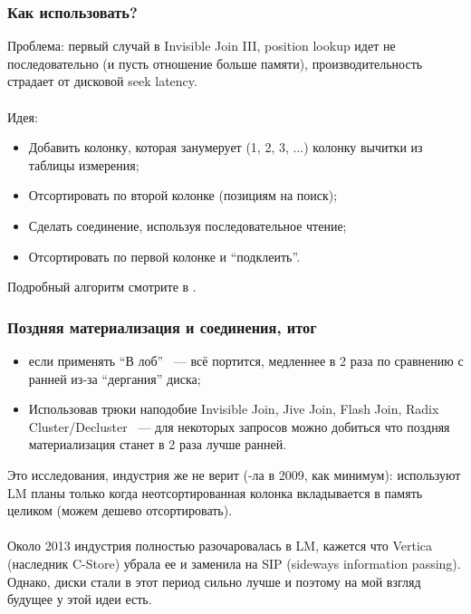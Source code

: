 \documentclass{beamer}
\begin{document}
\begin{frame}
\frametitle{Как использовать?}

Проблема: первый случай в Invisible Join III, position lookup идет не последовательно (и пусть отношение больше памяти), производительность страдает от дисковой seek latency.\\~\\

Идея:
\begin{itemize}
  \item Добавить колонку, которая занумерует (1, 2, 3, ...) колонку вычитки из таблицы измерения;
  \item Отсортировать по второй колонке (позициям на поиск);
  \item Сделать соединение, используя последовательное чтение;
  \item Отсортировать по первой колонке и ``подклеить''.
\end{itemize}

Подробный алгоритм смотрите в \cite{Harizopoulos2009}.

\end{frame}

\begin{frame}
\frametitle{Поздняя материализация и соединения, итог}

\begin{itemize}
  \item если применять ``В лоб'' ~--- всё портится, медленнее в 2 раза по сравнению с ранней из-за ``дергания'' диска;
  \item Использовав трюки наподобие Invisible Join, Jive Join, Flash Join, Radix Cluster/Decluster ~--- для некоторых запросов можно добиться что поздняя материализация станет в 2 раза лучше ранней.
\end{itemize}

Это исследования, индустрия же не верит (-ла в 2009, как минимум): используют LM планы только когда неотсортированная колонка вкладывается в память целиком (можем дешево отсортировать).\\~\\

Около 2013 индустрия полностью разочаровалась в LM, кажется что Vertica (наследник C-Store) убрала ее и заменила на SIP (sideways information passing). Однако, диски стали в этот период сильно лучше и поэтому на мой взгляд будущее у этой идеи есть.

\end{frame}
\end{document}
